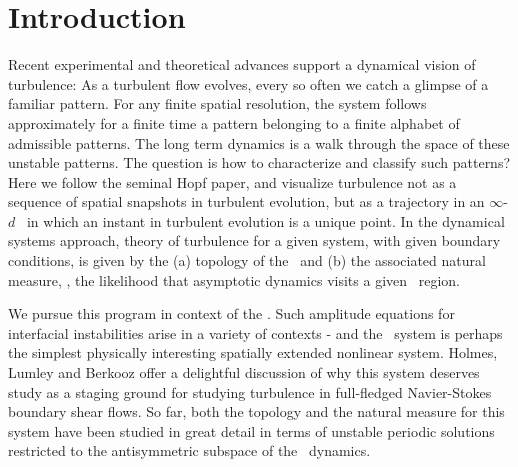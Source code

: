 %

\section{Introduction}

Recent experimental and theoretical advances
support a dynamical vision
of turbulence:
As a turbulent flow evolves,
every so often we catch a glimpse of a familiar pattern.
For any finite  spatial resolution,
the system follows approximately for a finite time 
a pattern belonging to a 
{ finite alphabet}
of admissible patterns.
The long term dynamics is
a {  walk through the space of these unstable patterns}.
The question is how to characterize and classify such patterns?
Here we follow the seminal Hopf paper, and  visualize
turbulence not as  a sequence of 
spatial snapshots in turbulent evolution,
but as a trajectory in an 
 $\infty$-$d$ \statesp\ in which an
instant in turbulent evolution is
a { unique} point. In the dynamical systems approach,  
theory of turbulence for a given system, with given boundary conditions,
is given by the
(a) topology of the \statesp\ and (b) the associated natural measure, 
\ie,
the likelihood that asymptotic dynamics visits a given \statesp\ region.

We pursue this program in context of
the \KSe{}.
Such 
amplitude equations for interfacial instabilities arise in a variety
of contexts - and 
the \KS\ system is perhaps the
simplest physically interesting spatially extended nonlinear system.
Holmes, Lumley
and Berkooz offer a delightful discussion of why this system
deserves study as a staging ground for studying turbulence in 
full-fledged Navier-Stokes boundary shear flows. 
So far, both the topology and the natural measure for
this system have been studied in great detail%
in terms of unstable periodic solutions
restricted to
the antisymmetric subspace of the \KS\ dynamics.


